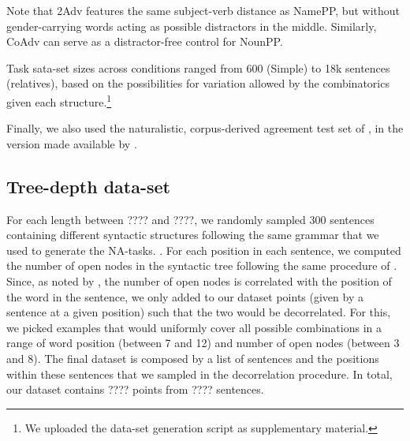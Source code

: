  Note that 2Adv features the same subject-verb
distance as NamePP, but without gender-carrying words acting as
possible distractors in the middle. Similarly, CoAdv can serve as a
distractor-free control for NounPP.

Task sata-set sizes across conditions ranged from 600 (Simple) to 18k sentences (relatives),
based on the possibilities for variation allowed by the combinatorics
given each structure.\footnote{We uploaded the data-set generation
  script as supplementary material.}

Finally, we also used the naturalistic, corpus-derived agreement test set of , in the version made available by .

\subsection{Tree-depth data-set}\label{ssec:n_opennodes}

For each length between ???? and ????, we randomly sampled 300 sentences
containing different syntactic structures following the same grammar that we
used to generate the NA-tasks.  . For each position in each sentence, we computed
the number of open nodes in the syntactic tree following the same procedure of
. Since, as noted by , the
number of open nodes is correlated with the position of the word in the
sentence, we only added to our dataset points (given by a sentence at a given
position) such that the two would be decorrelated.  For this, we picked
examples that would uniformly cover all possible combinations in a range of
word position (between 7 and 12) and number of open nodes (between 3 and 8).
The final dataset is composed by a list of sentences and the positions
within these sentences that we sampled in the decorrelation procedure. In
total, our dataset contains ???? points from ???? sentences.
